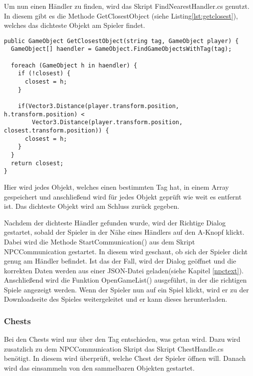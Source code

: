 Um nun einen Händler zu finden, wird das Skript FindNearestHandler.cs genutzt. In diesem gibt es die Methode GetClosestObject (siehe Listing\ref{lst:getclosest}), welches das dichteste Objekt am Spieler findet.
\begin{scriptsize}
\lstset{
	float,
	caption=Methode GetClosestObject aus FindNearestHandler.cs, 
	language=[Sharp]C, 
	frame=single,  
	showstringspaces=false, 
	showspaces=false, 
	numbers=left, 
	captionpos=b, 
	belowcaptionskip=4pt,
	basicstyle=\ttfamily
} 
\begin{lstlisting}[label=lst:getclosest]
public GameObject GetClosestObject(string tag, GameObject player) {
  GameObject[] haendler = GameObject.FindGameObjectsWithTag(tag);

  foreach (GameObject h in haendler) {
    if (!closest) {
      closest = h;
    }
           
    if(Vector3.Distance(player.transform.position, h.transform.position) < 
    	Vector3.Distance(player.transform.position, closest.transform.position)) {
      closest = h;
    }
  }
  return closest;
} 
\end{lstlisting}
\end{scriptsize}

Hier wird jedes Objekt, welches einen bestimmten Tag hat, in einem Array gespeichert und anschließend wird für jedes Objekt geprüft wie weit es entfernt ist. Das dichteste Objekt wird am Schluss zurück gegeben.

Nachdem der dichteste Händler gefunden wurde, wird der Richtige Dialog gestartet, sobald der Spieler in der Nähe eines Händlers auf den A-Knopf klickt. Dabei wird die Methode StartCommunication() aus dem Skript NPCCommunication gestartet. In diesem wird geschaut, ob sich der Spieler dicht genug am Händler befindet. Ist das der Fall, wird der Dialog geöffnet und die korrekten Daten werden aus einer JSON-Datei geladen(siehe Kapitel \ref{npctext}). Anschließend wird die Funktion OpenGameList() ausgeführt, in der die richtigen Spiele angezeigt werden. Wenn der Spieler nun auf ein Spiel klickt, wird er zu der Downloadseite des Spieles weitergeleitet und er kann dieses herunterladen.

\subsubsection{Chests}

Bei den Chests wird nur über den Tag entschieden, was getan wird. Dazu wird zusatzlich zu dem NPCCommunication Skript das Skript ChestHandle.cs benötigt. In diesem wird überprüft, welche Chest der Spieler öffnen will. Danach wird das einsammeln von den sammelbaren Objekten gestartet.


